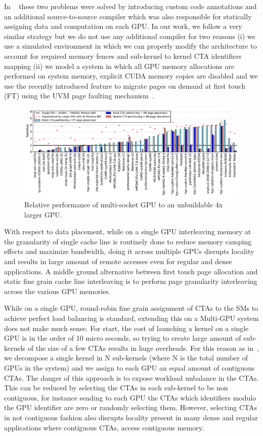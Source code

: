 In ~\cite{Cabezas2015} these two problems were solved by introducing custom 
code annotations and an additional source-to-source compiler which was also 
responsible for statically assigning data and computation on each GPU. In our 
work, we follow a very similar strategy but we do not use any additional 
compiler for two reasons (i) we use a simulated environment in which 
we can properly modify the architecture to account for required memory fences 
and sub-kernel to kernel CTA identifiers mapping (ii) we model a system in 
which all GPU memory allocations are performed on system memory, explicit 
CUDA memory copies are disabled and we use the recently introduced feature to 
migrate pages on demand at first touch (FT) using the UVM page faulting 
mechanism~\cite{P100}. 

\begin{figure}[tp]
    \centering
    \includegraphics[width=1\linewidth]{figures/plot_different_baselines.pdf}
    \caption{Relative performance of multi-socket GPU to an unbuildable 4x larger GPU.}
    \label{fig:motivation2}
\end{figure}

With respect to data placement, while on a single GPU interleaving memory at 
the granularity of single cache line is routinely done to reduce memory 
camping effects and maximize bandwidth, doing it across multiple GPUs 
disrupts locality and results in large amount of remote accesses even for 
regular and dense applications. A middle ground alternative between first 
touch page allocation and static fine grain cache line interleaving is to 
perform page granularity interleaving across the various GPU memories.

While on a single GPU, round-robin fine grain assignment of CTAs to the SMs 
to achieve perfect load balancing is standard, extending this on a Multi-GPU 
system does not make much sense. For start, the cost of launching a kernel on 
a single GPU is in the order of 10 micro seconds, so trying to create large 
amount of sub-kernels of the size of a few CTAs results in huge overheads. 
For this reason as in~\cite{Cabezas2015}, we decompose a single kernel in N 
sub-kernels (where N is the total number of GPUs in the system) and we assign 
to each GPU an equal amount of contiguous CTAs. The danger of this approach 
is to expose workload unbalance in the CTAs. This can be reduced by selecting 
the CTAs in each sub-kernel to be non contiguous, for instance sending to 
each GPU the CTAs which identifiers modulo the GPU identifier are zero or 
randomly selecting them. However, selecting CTAs in not contiguous fashion
also disrupts locality present in many dense and regular applications where 
contiguous CTAs, access contiguous memory.

